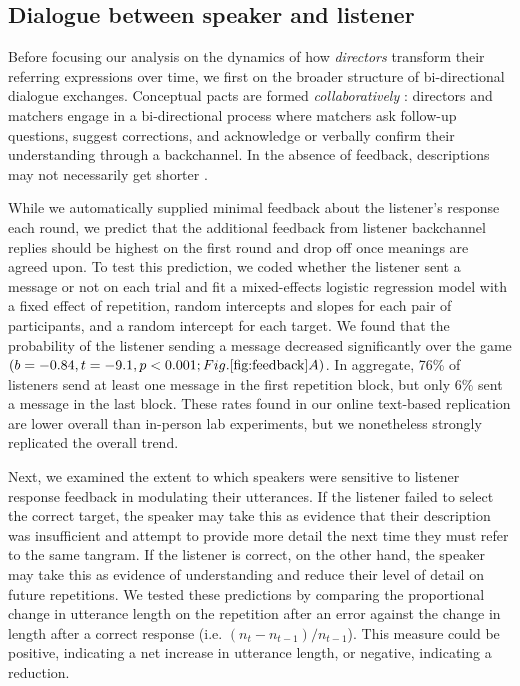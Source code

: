 \documentclass[alpha-refs]{wiley-article}
\begin{document}
\subsection{Dialogue between speaker and listener}\label{listener-feedback}

Before focusing our analysis on the dynamics of how \emph{directors} transform their referring expressions over time, we first on the broader structure of bi-directional dialogue exchanges.
Conceptual pacts are formed \emph{collaboratively} \citep{ClarkWilkesGibbs86_ReferringCollaborative}: 
directors and matchers engage in a bi-directional process where matchers ask follow-up questions, suggest corrections, and acknowledge or verbally confirm their understanding through a backchannel. 
In the absence of feedback, descriptions may not necessarily get shorter \citep{KraussWeinheimer66_Tangrams, GarrodFayLeeOberlanderMacLeod07_GraphicalSymbolSystems}.

While we automatically supplied minimal feedback about the listener's response each round, we predict that the additional feedback from listener backchannel replies should be highest on the first round and drop off once meanings are agreed upon. 
To test this prediction, we coded whether the listener sent a message or not on each trial and fit a mixed-effects logistic regression model with a fixed effect of repetition, random intercepts and slopes for each pair of participants, and a random intercept for each target. 
We found that the probability of the listener sending a message decreased significantly over the game $(b=-0.84, t = -9.1, p < 0.001; Fig. \ref{fig:feedback}A)$.
In aggregate, 76\% of listeners send at least one message in the first repetition block, but only 6\% sent a message in the last block.
These rates found in our online text-based replication are lower overall than in-person lab experiments, but we nonetheless strongly replicated the overall trend.

Next, we examined the extent to which speakers were sensitive to listener response feedback in modulating their utterances.
If the listener failed to select the correct target, the speaker may take this as evidence that their description was insufficient and attempt to provide more detail the next time they must refer to the same tangram. 
If the listener is correct, on the other hand, the speaker may take this as evidence of understanding and reduce their level of detail on future repetitions.
We tested these predictions by comparing the proportional change in utterance length on the repetition after an error against the change in length after a correct response (i.e. $(n_t - n_{t-1})/n_{t-1}$).
This measure could be positive, indicating a net increase in utterance length, or negative, indicating a reduction.
\end{document}
